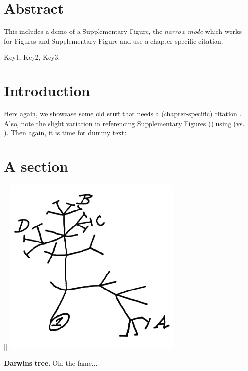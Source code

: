\section*{Abstract}
This includes a demo of a Supplementary Figure, the \textit{narrow mode} which works for Figures and Supplementary Figure and use a chapter-specific citation.

 Key1, Key2, Key3.

\begin{multicols}{2}
\section{Introduction}
\noindent
Here again, we showcase some old stuff that needs a (chapter-specific) citation .
Also, note the slight variation in referencing Supplementary Figures () using  (vs. ).
Then again, it is time for dummy text: 

\section{A section}
\begin{supplFigure*}[!t]
[\FBwidth]
{\includegraphics[width = .5\fwidth]{figures/c1/tree.jpg}}
{\caption[Darwins tree]{\label{fig:c1s1}\textbf{Darwins tree.}
Oh, the fame...}}
\end{supplFigure*}

\lipsum[2-4]

\end{multicols}